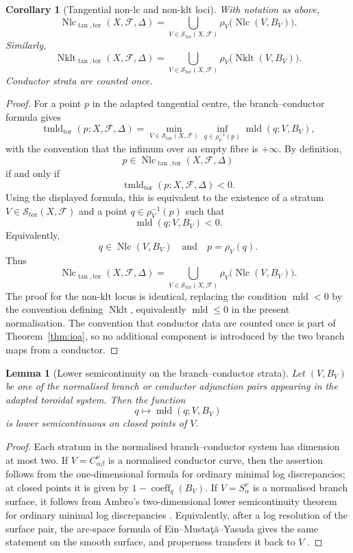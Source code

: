 \documentclass[11pt]{amsart}
\numberwithin{equation}{section}
\theoremstyle{plain}
\newtheorem{Lemma}[Theorem]{Lemma}
\newtheorem{Corollary}[Theorem]{Corollary}
\theoremstyle{definition}
\newcommand{\mld}{\operatorname{mld}}
\newcommand{\tmldtor}{\operatorname{tmld}_{\mathrm{tor}}}
\newcommand{\Nklt}{\operatorname{Nklt}}
\newcommand{\Nlc}{\operatorname{Nlc}}
\newcommand{\coeff}{\operatorname{coeff}}
\newcommand{\cF}{\mathcal F}
\begin{document}
\begin{Corollary}[Tangential non-lc and non-klt loci]
\label{cor:loci}
With notation as above,
\[
\Nlc_{\tan,\mathrm{tor}}(X,\cF,\Delta)
=
\bigcup_{V\in\mathcal S_{\mathrm{tor}}(X,\cF)}
\rho_V\bigl(\Nlc(V,B_V)\bigr).
\]
Similarly,
\[
\Nklt_{\tan,\mathrm{tor}}(X,\cF,\Delta)
=
\bigcup_{V\in\mathcal S_{\mathrm{tor}}(X,\cF)}
\rho_V\bigl(\Nklt(V,B_V)\bigr).
\]
Conductor strata are counted once.
\end{Corollary}

\begin{proof}
For a point \(p\) in the adapted tangential centre, the branch--conductor
formula gives
\[
\tmldtor(p;X,\cF,\Delta)
=
\min_{V\in\mathcal S_{\mathrm{tor}}(X,\cF)}
\inf_{q\in \rho_V^{-1}(p)}
\mld(q;V,B_V),
\]
with the convention that the infimum over an empty fibre is \(+\infty\).
By definition,
\[
p\in \Nlc_{\tan,\mathrm{tor}}(X,\cF,\Delta)
\]
if and only if
\[
\tmldtor(p;X,\cF,\Delta)<0.
\]
Using the displayed formula, this is equivalent to the existence of a stratum
\(V\in\mathcal S_{\mathrm{tor}}(X,\cF)\) and a point
\(q\in \rho_V^{-1}(p)\) such that
\[
\mld(q;V,B_V)<0.
\]
Equivalently,
\[
q\in \Nlc(V,B_V)
\quad\text{and}\quad
p=\rho_V(q).
\]
Thus
\[
\Nlc_{\tan,\mathrm{tor}}(X,\cF,\Delta)
=
\bigcup_{V\in\mathcal S_{\mathrm{tor}}(X,\cF)}
\rho_V\bigl(\Nlc(V,B_V)\bigr).
\]
The proof for the non-klt locus is identical, replacing the condition
\(\mld<0\) by the convention defining \(\Nklt\), equivalently
\(\mld\le 0\) in the present normalisation.  The convention that conductor
data are counted once is part of Theorem~\ref{thm:ioa}, so no additional
component is introduced by the two branch maps from a conductor.
\end{proof}

\begin{Lemma}[Lower semicontinuity on the branch--conductor strata]
\label{lem:lsc-strata}
Let \((V,B_V)\) be one of the normalised branch or conductor adjunction pairs
appearing in the adapted toroidal system.  Then the function
\[
q\longmapsto \mld(q;V,B_V)
\]
is lower semicontinuous on closed points of \(V\).
\end{Lemma}

\begin{proof}

Each stratum in the normalised branch--conductor system has dimension at most
two.  If \(V=C_{\alpha\beta}^{\nu}\) is a normalised conductor curve, then the
assertion follows from the one-dimensional formula for ordinary minimal log
discrepancies; at closed points it is given by \(1-\coeff_q(B_V)\).  If
\(V=S_\alpha^\nu\) is a normalised branch surface, it follows from Ambro's
two-dimensional lower semicontinuity theorem for ordinary minimal log
discrepancies \cite{AmbroMLD}.  Equivalently, after a log resolution of the
surface pair, the arc-space formula of Ein--Musta\c{t}\u{a}--Yasuda gives the
same statement on the smooth surface, and properness transfers it back to
\(V\) \cite{EMY}.
\end{proof}
\end{document}
